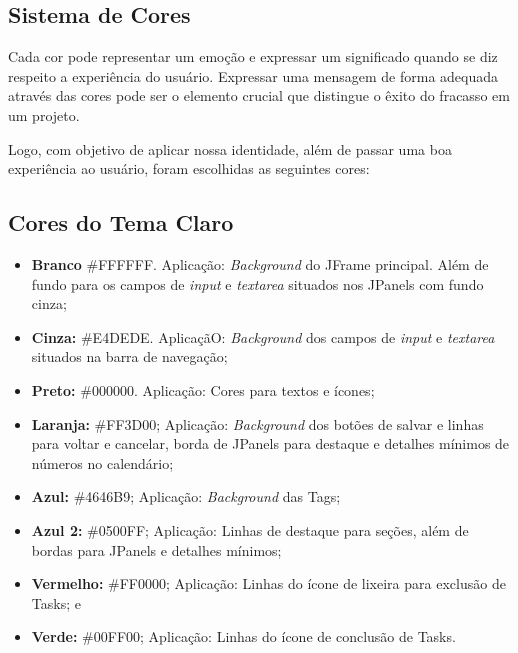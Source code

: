 \documentclass[a4paper,12pt]{article}
\begin{document}
\subsection{Sistema de Cores}
Cada cor pode representar um emoção e expressar um significado quando se diz respeito a experiência do usuário. Expressar uma mensagem de forma adequada através das cores pode ser o elemento crucial que distingue o êxito do fracasso em um projeto.

Logo, com objetivo de aplicar nossa identidade, além de passar uma boa experiência ao usuário, foram escolhidas as seguintes cores:

\subsection{Cores do Tema Claro}
\begin{itemize}
	\item \textbf{Branco} \#FFFFFF. Aplicação: \textit{Background} do JFrame principal. Além de fundo para os campos de \textit{input} e \textit{textarea} situados nos JPanels com fundo cinza;
	\item \textbf{Cinza:} \#E4DEDE. AplicaçãO: \textit{Background} dos campos de \textit{input} e \textit{textarea} situados na barra de navegação;
	\item \textbf{Preto:} \#000000. Aplicação: Cores para textos e ícones;
	\item \textbf{Laranja:} \#FF3D00; Aplicação: \textit{Background} dos botões de salvar e linhas para voltar e cancelar, borda de JPanels para destaque e detalhes mínimos de números no calendário;
	\item \textbf{Azul:} \#4646B9; Aplicação: \textit{Background} das Tags;
	\item \textbf{Azul 2:} \#0500FF; Aplicação: Linhas de destaque para seções, além de bordas para JPanels e detalhes mínimos;
	\item \textbf{Vermelho:} \#FF0000; Aplicação: Linhas do ícone de lixeira para exclusão de Tasks; e
	\item \textbf{Verde:} \#00FF00; Aplicação: Linhas do ícone de conclusão de Tasks.
\end{itemize}
\end{document}
